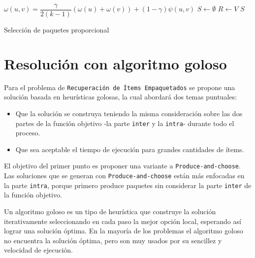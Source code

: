 \begin{center}
	\begin{algorithm}[H]
	\DontPrintSemicolon
	\SetAlgoLined
		$\omega(u,v) = \dfrac{\gamma}{2( k - 1)} (\omega(u) + \omega(v)) + (1 - \gamma)\psi(u,v)$\;
		$S \leftarrow \emptyset$\;
		$R \leftarrow V$\;
		\Return $S$\;
	\caption{Selección de paquetes proporcional}\label{alg:algSelProp}
	\end{algorithm}
\end{center}

\section{Resolución con algoritmo goloso}

Para el problema de \texttt{Recuperación de Ítems Empaquetados} se propone una solución basada en heurísticas golosas, la cual abordará dos temas puntuales:
\begin{itemize}
	\item Que la solución se construya teniendo la misma consideración sobre las dos partes de la función objetivo -la parte \texttt{inter} y la \texttt{intra}- durante todo el proceso.
	\item Que sea aceptable el tiempo de ejecución para grandes cantidades de ítems.
\end{itemize}

El objetivo del primer punto es proponer una variante a \texttt{Produce-and-choose}. Las soluciones que se generan con \texttt{Produce-and-choose} están más enfocadas en la parte \texttt{intra}, porque primero produce paquetes sin considerar la parte \texttt{inter} de la función objetivo.

Un algoritmo goloso es un tipo de heurística que construye la solución iterativamente seleccionando en cada paso la mejor opción local, esperando así lograr una solución óptima. En la mayoría de los problemas el algoritmo goloso no encuentra la solución óptima, pero son muy usados por su sencillez y velocidad de ejecución.

